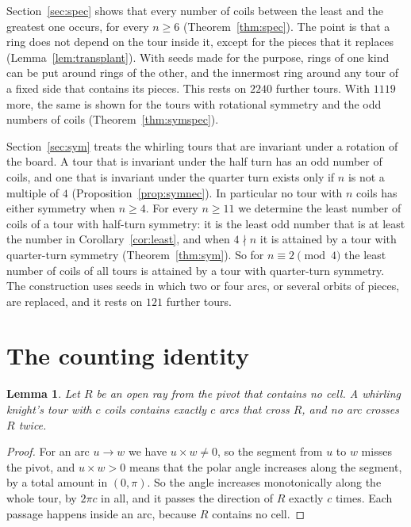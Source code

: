 \documentclass[11pt]{amsart}
\newtheorem{lemma}[theorem]{Lemma}
\theoremstyle{remark}
\begin{document}
Section~\ref{sec:spec} shows that every number of coils between the least and the greatest one occurs, for every
$n\ge6$ (Theorem~\ref{thm:spec}). The point is that a ring does not depend on the tour inside it, except for the
pieces that it replaces (Lemma~\ref{lem:transplant}). With seeds made for the purpose, rings of one kind can be put
around rings of the other, and the innermost ring around any tour of a fixed side that contains its pieces. This
rests on $2240$ further tours. With $1119$ more, the same is shown for the tours with rotational symmetry and the
odd numbers of coils (Theorem~\ref{thm:symspec}).

Section~\ref{sec:sym} treats the whirling tours that are invariant under a rotation of the board. A tour that is
invariant under the half turn has an odd number of coils, and one that is invariant under the quarter turn exists
only if $n$ is not a multiple of $4$ (Proposition~\ref{prop:symnec}). In particular no tour with $n$ coils has
either symmetry when $n\ge4$. For every $n\ge11$ we determine the least number of coils of a tour with half-turn
symmetry: it is the least odd number that is at least the number in Corollary~\ref{cor:least}, and when $4\nmid n$
it is attained by a tour with quarter-turn symmetry (Theorem~\ref{thm:sym}). So for $n\equiv2\pmod 4$ the least
number of coils of all tours is attained by a tour with quarter-turn symmetry. The construction uses seeds in which
two or four arcs, or several orbits of pieces, are replaced, and it rests on $121$ further tours.

\section{The counting identity}

\begin{lemma}\label{lem:rays}
Let $R$ be an open ray from the pivot that contains no cell. A whirling knight's tour with $c$ coils contains exactly
$c$ arcs that cross $R$, and no arc crosses $R$ twice.
\end{lemma}
\begin{proof}
For an arc $u\to w$ we have $u\times w\ne0$, so the segment from $u$ to $w$ misses the pivot, and $u\times w>0$ means
that the polar angle increases along the segment, by a total amount in $(0,\pi)$. So the angle increases monotonically
along the whole tour, by $2\pi c$ in all, and it passes the direction of $R$ exactly $c$ times. Each passage happens
inside an arc, because $R$ contains no cell.
\end{proof}
\end{document}
